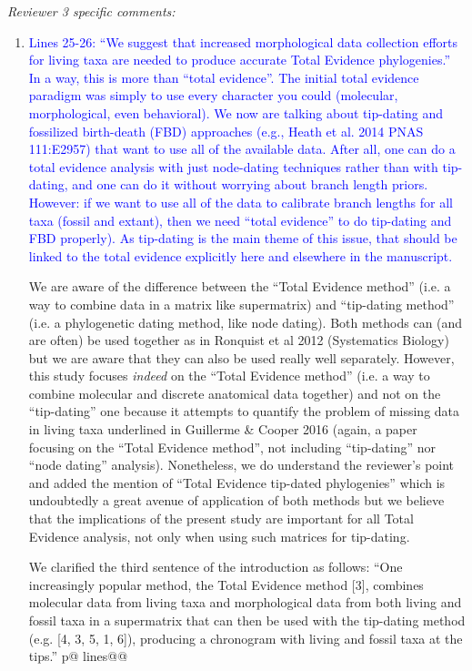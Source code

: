 \documentclass[12pt,letterpaper]{article}
\renewcommand{\subsection}[1]{%
\bigskip
\begin{center}
\begin{large}
\normalfont\itshape #1
\end{large}
\end{center}}
\begin{document}
\subsection{Reviewer 3 specific comments:}
\begin{enumerate}
\item{\textcolor{blue}{Lines 25-26: ``We suggest that increased morphological data collection efforts for living taxa are needed to produce accurate Total Evidence phylogenies.''
In a way, this is more than ``total evidence''.
The initial total evidence paradigm was simply to use every character you could (molecular, morphological, even behavioral).
We now are talking about tip-dating and fossilized birth-death (FBD) approaches (e.g., Heath et al. 2014 PNAS 111:E2957) that want to use all of the available data.
After all, one can do a total evidence analysis with just node-dating techniques rather than with tip-dating, and one can do it without worrying about branch length priors.
However: if we want to use all of the data to calibrate branch lengths for all taxa (fossil and extant), then we need ``total evidence'' to do tip-dating and FBD properly).
As tip-dating is the main theme of this issue, that should be linked to the total evidence explicitly here and elsewhere in the manuscript.}}

We are aware of the difference between the ``Total Evidence method'' (i.e. a way to combine data in a matrix like supermatrix) and ``tip-dating method'' (i.e. a phylogenetic dating method, like node dating).
Both methods can (and are often) be used together as in Ronquist et al 2012 (Systematics Biology) but we are aware that they can also be used really well separately.
However, this study focuses \textit{indeed} on the ``Total Evidence method'' (i.e. a way to combine molecular and discrete anatomical data together) and not on the ``tip-dating'' one because it attempts to quantify the problem of missing data in living taxa underlined in Guillerme \& Cooper 2016 (again, a paper focusing on the ``Total Evidence method'', not including ``tip-dating'' nor ``node dating'' analysis).
Nonetheless, we do understand the reviewer's point and added the mention of ``Total Evidence tip-dated phylogenies'' which is undoubtedly a great avenue of application of both methods but we believe that the implications of the present study are important for all Total Evidence analysis, not only when using such matrices for tip-dating.

We clarified the third sentence of the introduction as follows:
``One increasingly popular method, the Total Evidence method [3], combines molecular data from living taxa and morphological data from both living and fossil taxa in a supermatrix that can then be used with the tip-dating method (e.g. [4, 3, 5, 1, 6]), producing a chronogram with living and fossil taxa at the tips.'' p@ lines@@


\end{enumerate}
\end{document}
